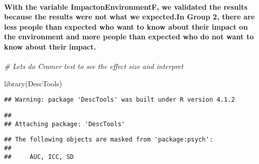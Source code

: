 \documentclass[
]{article}
\newenvironment{Shaded}{\begin{snugshade}}{\end{snugshade}}
\newcommand{\CommentTok}[1]{\textcolor[rgb]{0.56,0.35,0.01}{\textit{#1}}}
\newcommand{\FunctionTok}[1]{\textcolor[rgb]{0.00,0.00,0.00}{#1}}
\newcommand{\NormalTok}[1]{#1}
\newcommand{\SpecialCharTok}[1]{\textcolor[rgb]{0.00,0.00,0.00}{#1}}
\begin{document}
\hypertarget{with-the-variable-impactonenvironmentf-we-validated-the-results-because-the-results-were-not-what-we-expected.in-group-2-there-are-less-people-than-expected-who-want-to-know-about-their-impact-on-the-environment-and-more-people-than-expected-who-do-not-want-to-know-about-their-impact.}{%
\paragraph{With the variable ImpactonEnvironmentF, we validated the
results because the results were not what we expected.In Group 2, there
are less people than expected who want to know about their impact on the
environment and more people than expected who do not want to know about
their
impact.}\label{with-the-variable-impactonenvironmentf-we-validated-the-results-because-the-results-were-not-what-we-expected.in-group-2-there-are-less-people-than-expected-who-want-to-know-about-their-impact-on-the-environment-and-more-people-than-expected-who-do-not-want-to-know-about-their-impact.}}

\begin{Shaded}
\begin{Highlighting}[]
\CommentTok{\# Lets do Cramer test to see the effect size and interpret}

\FunctionTok{library}\NormalTok{(DescTools)}
\end{Highlighting}
\end{Shaded}

\begin{verbatim}
## Warning: package 'DescTools' was built under R version 4.1.2
\end{verbatim}

\begin{verbatim}
## 
## Attaching package: 'DescTools'
\end{verbatim}

\begin{verbatim}
## The following objects are masked from 'package:psych':
## 
##     AUC, ICC, SD
\end{verbatim}

\begin{Shaded}
\end{Shaded}
\end{document}
